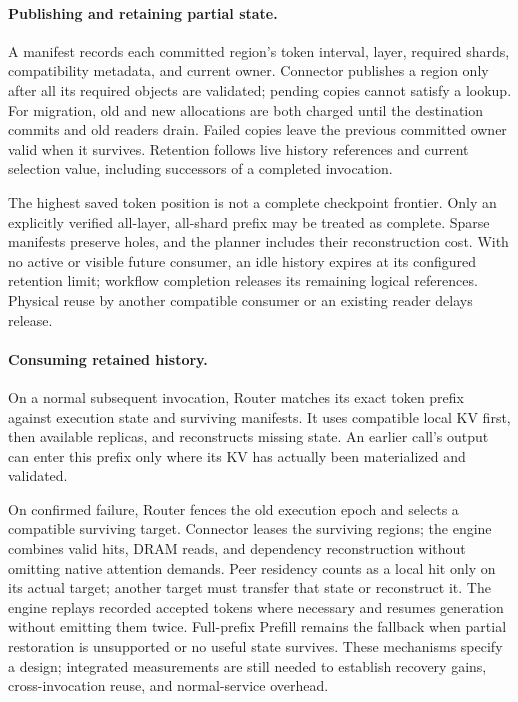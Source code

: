 \paragraph{Publishing and retaining partial state.}
A manifest records each committed region's token interval, layer,
required shards, compatibility metadata, and current owner. Connector
publishes a region only after all its required objects are validated;
pending copies cannot satisfy a lookup. For migration, old and new
allocations are both charged until the destination commits and old
readers drain. Failed copies leave the previous committed owner valid
when it survives. Retention follows live history references and current
selection value, including successors of a completed invocation.

The highest saved token position is not a complete checkpoint frontier.
Only an explicitly verified all-layer, all-shard prefix may be treated
as complete. Sparse manifests preserve holes, and the planner includes
their reconstruction cost. With no active or visible future consumer,
an idle history expires at its configured retention limit; workflow
completion releases its remaining logical references. Physical reuse
by another compatible consumer or an existing reader delays release.

\paragraph{Consuming retained history.}
On a normal subsequent invocation, Router matches its exact token prefix
against execution state and surviving manifests. It uses compatible
local KV first, then available replicas, and reconstructs missing state.
An earlier call's output can enter this prefix only where its KV has
actually been materialized and validated.

On confirmed failure, Router fences the old execution epoch and selects
a compatible surviving target. Connector leases the surviving regions;
the engine combines valid hits, DRAM reads, and dependency reconstruction
without omitting native attention demands. Peer residency counts as a
local hit only on its actual target; another target must transfer that
state or reconstruct it. The engine replays recorded accepted tokens
where necessary and resumes generation without emitting them twice.
Full-prefix Prefill remains the fallback when partial restoration is
unsupported or no useful state survives. These mechanisms specify a
design; integrated measurements are still needed to establish recovery
gains, cross-invocation reuse, and normal-service overhead.
